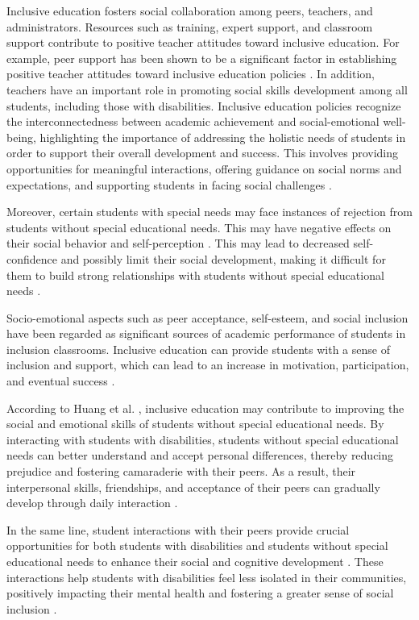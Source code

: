 \documentclass[10pt]{NSP1}
\begin{document}
	Inclusive education fosters social collaboration among peers, teachers, and administrators. Resources such as training, expert support, and classroom support contribute to positive teacher attitudes toward inclusive education. For example, peer support has been shown to be a significant factor in establishing positive teacher attitudes toward inclusive education policies \cite{ref16}. In addition, teachers have an important role in promoting social skills development among all students, including those with disabilities. Inclusive education policies recognize the interconnectedness between academic achievement and social-emotional well-being, highlighting the importance of addressing the holistic needs of students in order to support their overall development and success. This involves providing opportunities for meaningful interactions, offering guidance on social norms and expectations, and supporting students in facing social challenges \cite{ref17}.

	Moreover, certain students with special needs may face instances of rejection from students without special educational needs. This may have negative effects on their social behavior and self-perception \cite{ref18}. This may lead to decreased self-confidence and possibly limit their social development, making it difficult for them to build strong relationships with students without special educational needs \cite{ref19}.

	Socio-emotional aspects such as peer acceptance, self-esteem, and social inclusion have been regarded as significant sources of academic performance of students in inclusion classrooms. Inclusive education can provide students with a sense of inclusion and support, which can lead to an increase in motivation, participation, and eventual success \cite{ref20}.

	According to Huang et al. \cite{ref21}, inclusive education may contribute to improving the social and emotional skills of students without special educational needs. By interacting with students with disabilities, students without special educational needs can better understand and accept personal differences, thereby reducing prejudice and fostering camaraderie with their peers. As a result, their interpersonal skills, friendships, and acceptance of their peers can gradually develop through daily interaction \cite{ref30}.

	In the same line, student interactions with their peers provide crucial opportunities for both students with disabilities and students without special educational needs to enhance their social and cognitive development \cite{ref14}. These interactions help students with disabilities feel less isolated in their communities, positively impacting their mental health and fostering a greater sense of social inclusion \cite{ref23}.
\end{document}
